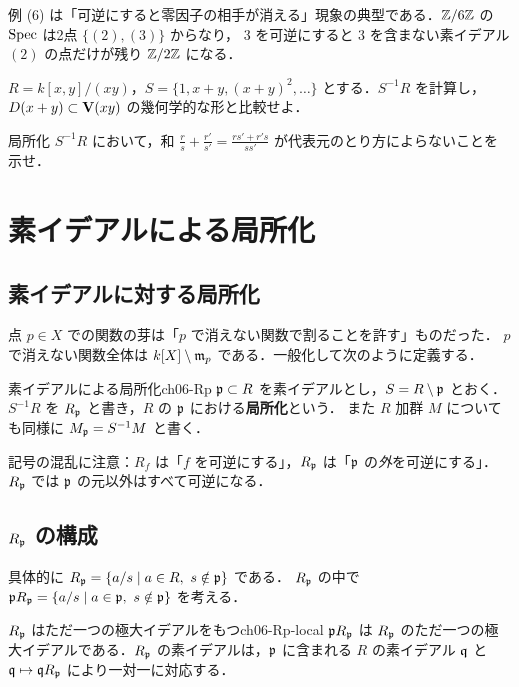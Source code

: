 例 (6) は「可逆にすると零因子の相手が消える」現象の典型である．$\mathbb{Z}/6\mathbb{Z}$ の $\operatorname{Spec}$ は2点 $\{(2),(3)\}$ からなり，
$3$ を可逆にすると $3$ を含まない素イデアル $(2)$ の点だけが残り $\mathbb{Z}/2\mathbb{Z}$ になる．

$R=k[x,y]/(xy)$，$S=\{1,x+y,(x+y)^2,\dots\}$ とする．$S^{-1}R$ を計算し，$D(x+y)\subset\mathbf{V}(xy)$ の幾何学的な形と比較せよ．

局所化 $S^{-1}R$ において，和 $\frac rs+\frac{r'}{s'}=\frac{rs'+r's}{ss'}$ が代表元のとり方によらないことを示せ．

\section{素イデアルによる局所化}

\subsection{素イデアルに対する局所化}

点 $p\in X$ での関数の芽は「$p$ で消えない関数で割ることを許す」ものだった．
$p$ で消えない関数全体は $k[X]\setminus\mathfrak{m}_p$ である．一般化して次のように定義する．

\begin{mydef}{素イデアルによる局所化}{ch06-Rp}
$\mathfrak{p}\subset R$ を素イデアルとし，$S=R\setminus\mathfrak{p}$ とおく．$S^{-1}R$ を $R_{\mathfrak{p}}$ と書き，$R$ の $\mathfrak{p}$ における\textbf{局所化}という．
また $R$ 加群 $M$ についても同様に $M_{\mathfrak{p}}=S^{-1}M$ と書く．
\end{mydef}

記号の混乱に注意：$R_f$ は「$f$ を可逆にする」，$R_{\mathfrak{p}}$ は「$\mathfrak{p}$ の\emph{外}を可逆にする」．
$R_{\mathfrak{p}}$ では $\mathfrak{p}$ の元以外はすべて可逆になる．

\subsection{$R_{\mathfrak{p}}$ の構成}

具体的に $R_\p=\{a/s\mid a\in R,\ s\notin\p\}$ である．
$R_{\mathfrak{p}}$ の中で $\p R_\p=\{a/s\mid a\in\p,\ s\notin\p\}$ を考える．

\begin{myprop}{$R_{\mathfrak{p}}$ はただ一つの極大イデアルをもつ}{ch06-Rp-local}
$\mathfrak{p} R_{\mathfrak{p}}$ は $R_{\mathfrak{p}}$ のただ一つの極大イデアルである．$R_{\mathfrak{p}}$ の素イデアルは，$\mathfrak{p}$ に含まれる $R$ の素イデアル $\mathfrak{q}$ と $\mathfrak{q}\mapsto\mathfrak{q} R_{\mathfrak{p}}$ により一対一に対応する．
\end{myprop}

